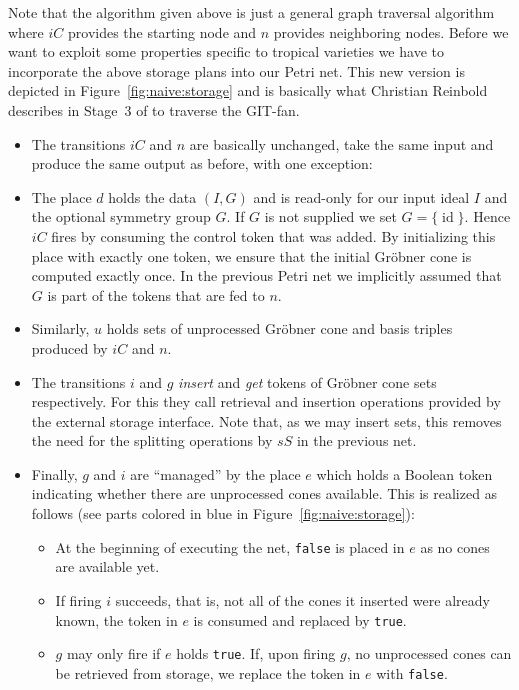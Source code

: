 \documentclass[
  paper=a4,
  titlepage,
  bibliography=totoc,
  pagesize=pdftex
]{scrartcl}
\numberwithin{figure}{section}
\numberwithin{equation}{section}
\numberwithin{table}{section}
\DeclareMathOperator{\id}{id}
\theoremstyle{definition}
\numberwithin{definition}{section}
\begin{document}
Note that the algorithm given above is just a general graph traversal algorithm where $iC$
provides the starting node and $n$ provides neighboring nodes. Before we want to exploit
some properties specific to tropical varieties we have to incorporate the above storage
plans into our Petri net. This new version is depicted in Figure~\ref{fig:naive:storage}
and is basically what Christian Reinbold describes in Stage~3 of
\cite[Section~4.4]{reinboldGitFan} to traverse the GIT-fan.
\begin{itemize}
  \item The transitions $iC$ and $n$ are basically unchanged, take the same input and
    produce the same output as before, with one exception:
  \item The place $d$ holds the data $(I, G)$ and is read-only for our input ideal $I$ and
    the optional symmetry group $G$. If $G$ is not supplied we set $G=\{\id\}$. Hence $iC$
    fires by consuming the control token that was added. By initializing this place with
    exactly one token, we ensure that the initial Gröbner cone is computed exactly once.
    In the previous Petri net we implicitly assumed that $G$ is part of the tokens that
    are fed to $n$.
  \item Similarly, $u$ holds sets of unprocessed Gröbner cone and basis triples produced
    by $iC$ and $n$.
  \item The transitions $i$ and $g$ \emph{insert} and \emph{get} tokens of Gröbner cone
    sets respectively. For this they call retrieval and insertion operations provided by
    the external storage interface. Note that, as we may insert sets, this removes the
    need for the splitting operations by $sS$ in the previous net.
  \item Finally, $g$ and $i$ are \enquote{managed} by the place $e$ which holds a Boolean
    token indicating whether there are unprocessed cones available. This is realized as
    follows (see parts colored in blue in Figure~\ref{fig:naive:storage}):
    \begin{itemize}
      \item At the beginning of executing the net, \texttt{false} is placed in $e$ as no
        cones are available yet.
      \item If firing $i$ succeeds, that is, not all of the cones it inserted were already
        known, the token in $e$ is consumed and replaced by \texttt{true}.
      \item $g$ may only fire if $e$ holds \texttt{true}. If, upon firing $g$, no
        unprocessed cones can be retrieved from storage, we replace the token in $e$ with
        \texttt{false}.
    \end{itemize}
\end{itemize}
\end{document}
